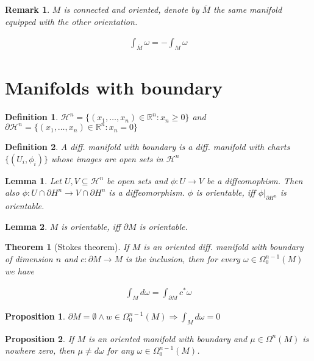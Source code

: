 \documentclass{scrartcl}
\newcommand{\R}{\mathbb R}
\newtheorem*{mydef}{Definition}
\newtheorem*{lemma}{Lemma}
\newtheorem*{prop}{Proposition}
\newtheorem*{thm}{Theorem}
\newtheorem*{remark}{Remark}
\begin{document}
\begin{remark}
  $M$ is connected and oriented, denote by $\overline M$ the same manifold equipped with the other orientation.

  \begin{align}
    \int_{\overline M} \omega = - \int_M \omega
  \end{align}
\end{remark}

\section{Manifolds with boundary}

\begin{mydef}
  $\mathcal H^n = \{ (x_1,\dots,x_n) \in \R^n : x_n \ge 0\}$ and $\partial \mathcal H^n = \{ (x_1,\dots,x_n)\in \R^n: x_n = 0 \}$
\end{mydef}

\begin{mydef}
  A diff. manifold with boundary is a diff. manifold with charts $\{(U_i,\phi_i)\}$ whose images are open sets in $\mathcal H^n$
\end{mydef}

\begin{lemma}
  Let $U,V\subseteq \mathcal H^n$ be open sets and $\phi: U \rightarrow V$ be a diffeomophism. Then also $\phi: U \cap \partial H^n \rightarrow V \cap \partial H^n$ is a diffeomorphism. $\phi$ is orientable, iff $\phi|_{\partial H^n}$ is orientable.
\end{lemma}

\begin{lemma}
  $M$ is orientable, iff $\partial M$ is orientable.
\end{lemma}

\begin{thm}[Stokes theorem]
  If $M$ is an oriented diff. manifold with boundary of dimension $n$ and $c: \partial M \rightarrow M$ is the inclusion, then for every $\omega\in \Omega_0^{n-1}(M)$ we have

  \begin{align}
    \int_M d\omega = \int_{\partial M} c^* \omega
  \end{align}
\end{thm}

\begin{prop}
  $\partial M = \emptyset \land w\in \Omega_0^{n-1}(M) \Rightarrow \int_M d\omega = 0$
\end{prop}

\begin{prop}
  If $M$ is an oriented manifold with boundary and $\mu \in \Omega^n(M)$ is nowhere zero, then $\mu \ne d\omega$ for any $\omega \in \Omega_0^{n-1}(M)$.
\end{prop}
\end{document}
